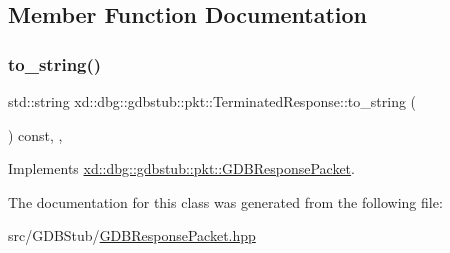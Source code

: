\subsection{Member Function Documentation}
\mbox{\label{classxd_1_1dbg_1_1gdbstub_1_1pkt_1_1_terminated_response_abf937638e57e626785942dd18b6160a9}} 
\subsubsection{\texorpdfstring{to\+\_\+string()}{to\_string()}}
{\footnotesize\ttfamily std\+::string xd\+::dbg\+::gdbstub\+::pkt\+::\+Terminated\+Response\+::to\+\_\+string (\begin{DoxyParamCaption}{ }\end{DoxyParamCaption}) const\hspace{0.3cm}{\ttfamily [inline]}, {\ttfamily [override]}, {\ttfamily [virtual]}}



Implements \mbox{\hyperlink{classxd_1_1dbg_1_1gdbstub_1_1pkt_1_1_g_d_b_response_packet_a2a15795536cd5ff94f0533c406233874}{xd\+::dbg\+::gdbstub\+::pkt\+::\+G\+D\+B\+Response\+Packet}}.



The documentation for this class was generated from the following file\+:\begin{DoxyCompactItemize}
\item 
src/\+G\+D\+B\+Stub/\mbox{\hyperlink{_g_d_b_response_packet_8hpp}{G\+D\+B\+Response\+Packet.\+hpp}}\end{DoxyCompactItemize}
